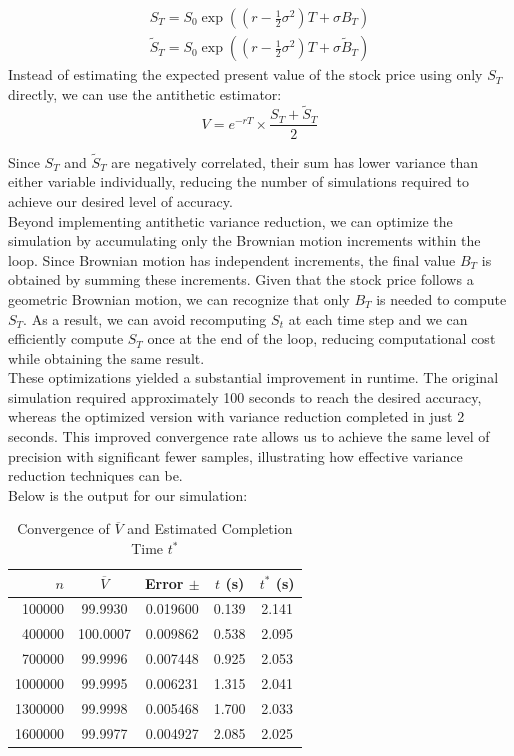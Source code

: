 \documentclass{report}
\begin{document}
\begin{align*}
S_T=S_0\exp((r-\frac{1}{2}\sigma^2)T + \sigma B_T) \\
\widetilde{S}_T=S_0\exp((r-\frac{1}{2}\sigma^2)T + \sigma \widetilde{B}_T)
\end{align*}
Instead of estimating the expected present value of the stock price using only $S_T$ directly, we can use the antithetic estimator:
\[
V = e^{-rT} \times \frac{S_T + \widetilde{S}_T}{2}
\]

Since $S_T$ and $\widetilde{S}_T$ are negatively correlated, their sum has lower variance than either variable individually, reducing the number of simulations required to achieve our desired level of accuracy. \\

Beyond implementing antithetic variance reduction, we can optimize the simulation by accumulating only the Brownian motion increments within the loop. Since Brownian motion has independent increments, the final value $B_T$ is obtained by summing these increments. Given that the stock price follows a geometric Brownian motion, we can recognize that only $B_T$ is needed to compute $S_T$. As a result, we can avoid recomputing $S_t$ at each time step and we can efficiently compute $S_T$ once at the end of the loop, reducing computational cost while obtaining the same result. \\

These optimizations yielded a substantial improvement in runtime. The original simulation required approximately 100 seconds to reach the desired accuracy, whereas the optimized version with variance reduction completed in just 2 seconds. This improved convergence rate allows us to achieve the same level of precision with significant fewer samples, illustrating how effective variance reduction techniques can be.  \\

Below is the output for our simulation:

\begin{table}[H]
    \centering
    \caption{Convergence of $\overline{V}$ and Estimated Completion Time $t^*$}
    \label{tab:simulation_results}
    \begin{tabular}{rcccc}
        \hline
        $n$ & $\overline{V}$ & Error $\pm$ & $t$ (s) & $t^*$ (s) \\
        \hline
        100000  & 99.9930  & 0.019600 & 0.139 & 2.141 \\
        400000  & 100.0007 & 0.009862 & 0.538 & 2.095 \\
        700000  & 99.9996  & 0.007448 & 0.925 & 2.053 \\
        1000000 & 99.9995  & 0.006231 & 1.315 & 2.041 \\
        1300000 & 99.9998  & 0.005468 & 1.700 & 2.033 \\
        1600000 & 99.9977  & 0.004927 & 2.085 & 2.025 \\
        \hline
    \end{tabular}
\end{table}
\end{document}
